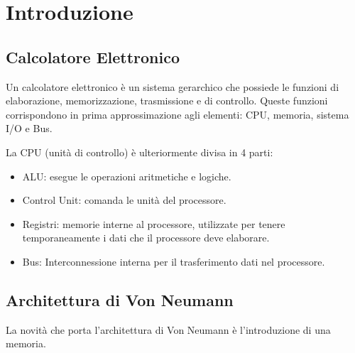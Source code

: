 \documentclass[../ace.tex]{subfiles}
\begin{document}
\section{Introduzione}
\subsection{Calcolatore Elettronico}
Un calcolatore elettronico è un sistema gerarchico che possiede le funzioni di elaborazione,
memorizzazione, trasmissione e di controllo.  Queste funzioni corrispondono in prima
approssimazione agli elementi: CPU, memoria, sistema I/O e Bus.

La CPU (unità di controllo) è ulteriormente divisa in 4 parti:
\begin{itemize}
    \item ALU: esegue le operazioni aritmetiche e logiche.
    \item Control Unit: comanda le unità del processore.
    \item Registri: memorie interne al processore, utilizzate per tenere temporaneamente i
        dati che il processore deve elaborare.
    \item Bus: Interconnessione interna per il trasferimento dati nel processore.
\end{itemize}

\subsection{Architettura di Von Neumann}
\begin{center}
\end{center}

La novità che porta l'architettura di Von Neumann è l'introduzione di una memoria.
\end{document}
